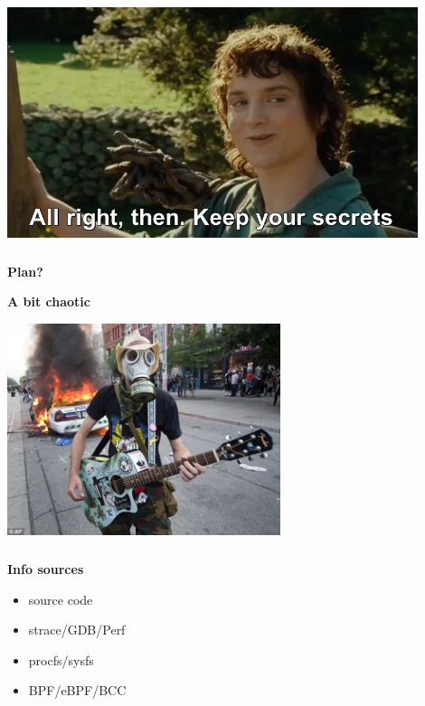 \documentclass[usenames,dvipsnames, 18pt, compress, aspectratio=169]{beamer}
\begin{document}
\begin{frame}
    \frametitle{}
    \begin{center}

    \includegraphics[width=0.9\textwidth,center]{keep_your_secrets.jpg}

    \end{center}
\end{frame}

\begin{frame}
    \frametitle{}
    \begin{center}
     {
        \textbf{Plan?}
    }

     {
        \textbf{A bit chaotic}
        \vspace{0.5cm}

        \includegraphics[width=0.6\textwidth,center]{anarchy.jpg}

        \vspace{-0.55cm}
        \tiny{\color{white}{dailymail.co.uk}}
    }

    \end{center}
\end{frame}

\begin{frame}
    \frametitle{}
    \begin{center}
    \textbf{Info sources}

        \begin{itemize}[]
            \item source code
            \item strace/GDB/Perf
            \item procfs/sysfs
            \item BPF/eBPF/BCC
        \end{itemize}

    \end{center}
\end{frame}
\end{document}
